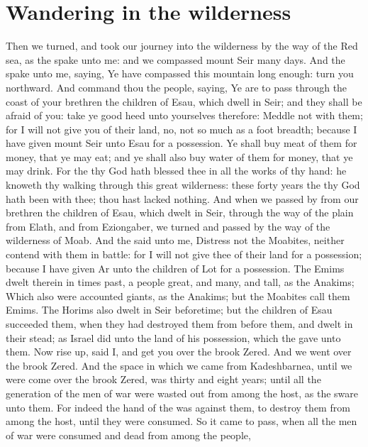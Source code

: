 \section*{Wandering in the wilderness}
\begin{biblechapter} %
\verse Then we turned, and took our journey into the wilderness by the way of the Red sea, as the \LORD spake unto me: and we compassed mount Seir many days.
\verse And the \LORD spake unto me, saying,
\verse Ye have compassed this mountain long enough: turn you northward.
\verse And command thou the people, saying, Ye are to pass through the coast of your brethren the children of Esau, which dwell in Seir; and they shall be afraid of you: take ye good heed unto yourselves therefore:
\verse Meddle not with them; for I will not give you of their land, no, not so much as a foot breadth; because I have given mount Seir unto Esau for a possession.
\verse Ye shall buy meat of them for money, that ye may eat; and ye shall also buy water of them for money, that ye may drink.
\verse For the \LORD thy God hath blessed thee in all the works of thy hand: he knoweth thy walking through this great wilderness: these forty years the \LORD thy God hath been with thee; thou hast lacked nothing.
\verse And when we passed by from our brethren the children of Esau, which dwelt in Seir, through the way of the plain from Elath, and from Eziongaber, we turned and passed by the way of the wilderness of Moab.
\verse And the \LORD said unto me, Distress not the Moabites, neither contend with them in battle: for I will not give thee of their land for a possession; because I have given Ar unto the children of Lot for a possession.
\verse The Emims dwelt therein in times past, a people great, and many, and tall, as the Anakims;
\verse Which also were accounted giants, as the Anakims; but the Moabites call them Emims.
\verse The Horims also dwelt in Seir beforetime; but the children of Esau succeeded them, when they had destroyed them from before them, and dwelt in their stead; as Israel did unto the land of his possession, which the \LORD gave unto them.
\verse Now rise up, said I, and get you over the brook Zered. And we went over the brook Zered.
\verse And the space in which we came from Kadeshbarnea, until we were come over the brook Zered, was thirty and eight years; until all the generation of the men of war were wasted out from among the host, as the \LORD sware unto them.
\verse For indeed the hand of the \LORD was against them, to destroy them from among the host, until they were consumed.
\verse So it came to pass, when all the men of war were consumed and dead from among the people,

\end{biblechapter}

